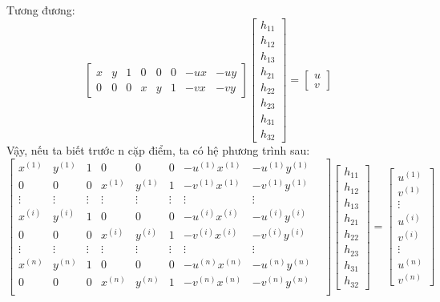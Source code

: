 \documentclass{article}
\begin{document}
Tương đương:
\begin{equation}
    \begin{bmatrix}
        x & y&1&0&0&0&-ux&-uy\\
        0&0&0&x&y&1&-vx&-vy
    \end{bmatrix} \begin{bmatrix}
        h_{11}\\h_{12}\\h_{13}\\h_{21}\\h_{22}\\h_{23}\\h_{31}\\h_{32}
    \end{bmatrix} = \begin{bmatrix}
        u\\v
    \end{bmatrix}
\label{eq13}
\end{equation}
Vậy, nếu ta biết trước n cặp điểm, ta có hệ phương trình sau:
\begin{equation}
    \begin{bmatrix}
        x^{(1)} & y^{(1)}&1&0&0&0&-u^{(1)}x^{(1)}&-u^{(1)}y^{(1)}\\
        0&0&0&x^{(1)}&y^{(1)}&1&-v^{(1)}x^{(1)}&-v^{(1)}y^{(1)}\\
        \vdots&\vdots&\vdots&\vdots&\vdots&\vdots&\vdots&\vdots\\
                x^{(i)} & y^{(i)}&1&0&0&0&-u^{(i)}x^{(i)}&-u^{(i)}y^{(i)}\\
        0&0&0&x^{(i)}&y^{(i)}&1&-v^{(i)}x^{(i)}&-v^{(i)}y^{(i)}\\
        \vdots&\vdots&\vdots&\vdots&\vdots&\vdots&\vdots&\vdots&\\
                x^{(n)} & y^{(n)}&1&0&0&0&-u^{(n)}x^{(n)}&-u^{(n)}y^{(n)}\\
        0&0&0&x^{(n)}&y^{(n)}&1&-v^{(n)}x^{(n)}&-v^{(n)}y^{(n)}\\
    \end{bmatrix} \begin{bmatrix}
        h_{11}\\h_{12}\\h_{13}\\h_{21}\\h_{22}\\h_{23}\\h_{31}\\h_{32}
    \end{bmatrix} = \begin{bmatrix}
        u^{(1)}\\v^{(1)}\\ \vdots\\u^{(i)}\\v^{(i)}\\ \vdots \\ u^{(n)}\\v^{(n)}
    \end{bmatrix}
    \label{eq14}
\end{equation}
\end{document}
